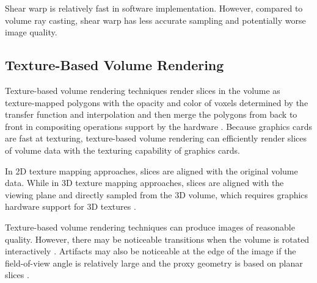 Shear warp is relatively fast in software implementation.
However, compared to volume ray casting, shear warp has less accurate sampling and potentially worse image quality.

\subsection{Texture-Based Volume Rendering}

Texture-based volume rendering techniques render slices in the volume as texture-mapped polygons with the opacity and color of voxels determined by the transfer function and interpolation and then merge the polygons from back to front in compositing operations support by the hardware \cite{rezk-salama_interactive_2000}.
Because graphics cards are fast at texturing, texture-based volume rendering \cite{hibbard_interactivity_1989} can efficiently render slices of volume data with the texturing capability of graphics cards.

In 2D texture mapping approaches, slices are aligned with the original volume data.
While in 3D texture mapping approaches, slices are aligned with the viewing plane and directly sampled from the 3D volume, which requires graphics hardware support for 3D textures \cite{westermann_accelerated_2001}.

Texture-based volume rendering techniques can produce images of reasonable quality. However, there may be noticeable transitions when the volume is rotated interactively \cite{kruger_new_2010}. Artifacts may also be noticeable at the edge of the image if the field-of-view angle is relatively large and the proxy geometry is based on planar slices \cite{hadwiger_real-time_2006}.

